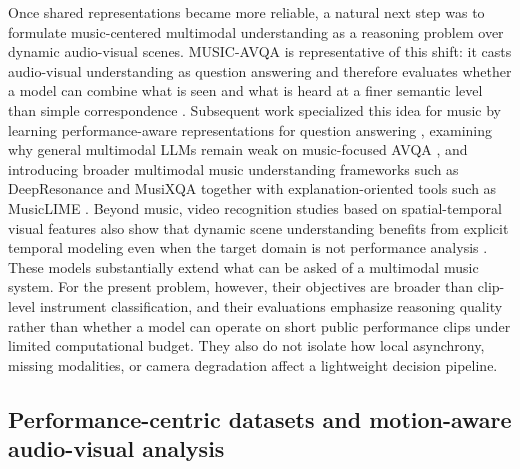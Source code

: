 Once shared representations became more reliable, a natural next step was to formulate music-centered multimodal understanding as a reasoning problem over dynamic audio-visual scenes. MUSIC-AVQA is representative of this shift: it casts audio-visual understanding as question answering and therefore evaluates whether a model can combine what is seen and what is heard at a finer semantic level than simple correspondence \citep{Li2022MusicAVQA}. Subsequent work specialized this idea for music by learning performance-aware representations for question answering \citep{Diao2024MPQA}, examining why general multimodal LLMs remain weak on music-focused AVQA \citep{You2025Complexity}, and introducing broader multimodal music understanding frameworks such as DeepResonance and MusiXQA together with explanation-oriented tools such as MusicLIME \citep{Mao2025DeepResonance,Chen2025MusiXQA,Sotirou2025MusicLIME}. Beyond music, video recognition studies based on spatial-temporal visual features also show that dynamic scene understanding benefits from explicit temporal modeling even when the target domain is not performance analysis \citep{Divya2025ActivityDetection}. These models substantially extend what can be asked of a multimodal music system. For the present problem, however, their objectives are broader than clip-level instrument classification, and their evaluations emphasize reasoning quality rather than whether a model can operate on short public performance clips under limited computational budget. They also do not isolate how local asynchrony, missing modalities, or camera degradation affect a lightweight decision pipeline.

\subsection{Performance-centric datasets and motion-aware audio-visual analysis}

